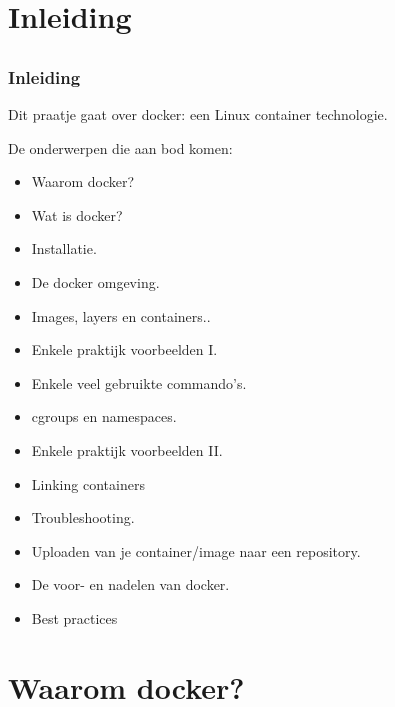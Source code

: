 \section{Inleiding}
\subsection{}
\begin{styleframe}
	\frametitle{Inleiding}
Dit praatje gaat over docker: een Linux container technologie.

De onderwerpen die aan bod komen:
\begin{itemize}
	\item Waarom docker?
	\item Wat is docker?
	\item Installatie.
	\item De docker omgeving.
	\item Images, layers en containers..
	\item Enkele praktijk voorbeelden I.
	\item Enkele veel gebruikte commando's.
	\item cgroups en namespaces.
	\item Enkele praktijk voorbeelden II.
	\item Linking containers
	\item Troubleshooting.
	\item Uploaden van je container/image naar een repository.
	\item De voor- en nadelen van docker.
	\item Best practices
\end{itemize}
\end{styleframe}

\section{Waarom docker?}
